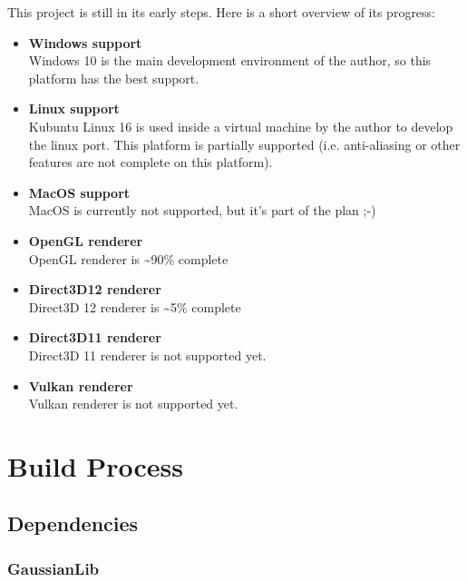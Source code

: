 \documentclass{article}
\begin{document}
This project is still in its early steps. Here is a short overview of its progress:
\begin{itemize}
	\item \textbf{Windows support} \\
	Windows 10 is the main development environment of the author, so this platform has the best support.
	
	\item \textbf{Linux support} \\
	Kubuntu Linux 16 is used inside a virtual machine by the author to develop the linux port.
	This platform is partially supported (i.e. anti-aliasing or other features are not complete on this platform).
	
	\item \textbf{MacOS support} \\
	MacOS is currently not supported, but it's part of the plan ;-)
	
	\item \textbf{OpenGL renderer} \\
	OpenGL renderer is \textasciitilde 90\% complete
	
	\item \textbf{Direct3D12 renderer} \\
	Direct3D 12 renderer is \textasciitilde 5\% complete
	
	\item \textbf{Direct3D11 renderer} \\
	Direct3D 11 renderer is not supported yet.
	
	\item \textbf{Vulkan renderer} \\
	Vulkan renderer is not supported yet.
\end{itemize}



\newpage
\section*{Build Process}

\subsection*{Dependencies}

\subsubsection*{GaussianLib}
\end{document}
